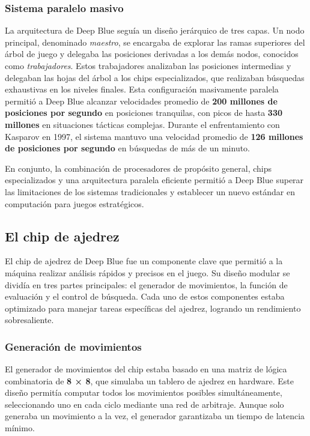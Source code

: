 \documentclass[12pt,a4paper]{article}
\begin{document}
\subsubsection*{Sistema paralelo masivo}
La arquitectura de Deep Blue seguía un diseño jerárquico de tres capas. Un nodo principal, denominado \textit{maestro}, se encargaba de explorar las ramas superiores del árbol de juego y delegaba las posiciones derivadas a los demás nodos, conocidos como \textit{trabajadores}. Estos trabajadores analizaban las posiciones intermedias y delegaban las hojas del árbol a los chips especializados, que realizaban búsquedas exhaustivas en los niveles finales. Esta configuración masivamente paralela permitió a Deep Blue alcanzar velocidades promedio de \textbf{200 millones de posiciones por segundo} en posiciones tranquilas, con picos de hasta \textbf{330 millones} en situaciones tácticas complejas. Durante el enfrentamiento con Kasparov en 1997, el sistema mantuvo una velocidad promedio de \textbf{126 millones de posiciones por segundo} en búsquedas de más de un minuto.

En conjunto, la combinación de procesadores de propósito general, chips especializados y una arquitectura paralela eficiente permitió a Deep Blue superar las limitaciones de los sistemas tradicionales y establecer un nuevo estándar en computación para juegos estratégicos.

\subsection{El chip de ajedrez}

El chip de ajedrez de Deep Blue fue un componente clave que permitió a la máquina realizar análisis rápidos y precisos en el juego. Su diseño modular se dividía en tres partes principales: el generador de movimientos, la función de evaluación y el control de búsqueda. Cada uno de estos componentes estaba optimizado para manejar tareas específicas del ajedrez, logrando un rendimiento sobresaliente.

\subsubsection*{Generación de movimientos}
El generador de movimientos del chip estaba basado en una matriz de lógica combinatoria de \textbf{8 × 8}, que simulaba un tablero de ajedrez en hardware. Este diseño permitía computar todos los movimientos posibles simultáneamente, seleccionando uno en cada ciclo mediante una red de arbitraje. Aunque solo generaba un movimiento a la vez, el generador garantizaba un tiempo de latencia mínimo. 
\end{document}
